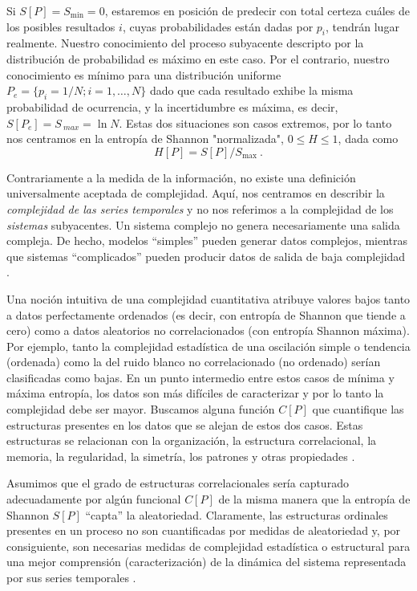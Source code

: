 Si $S[P] = S_{\min} = 0$, estaremos en posición de predecir con total certeza cuáles de los posibles resultados $i$, cuyas probabilidades están dadas por $p_i$, tendrán lugar realmente.
Nuestro conocimiento del proceso subyacente descripto por la distribución de probabilidad es máximo en este caso.
Por el contrario, nuestro conocimiento es mínimo para una distribución uniforme $P_e = \{p_i = 1/N; i = 1, \ldots, N \}$ dado que cada resultado exhibe la misma probabilidad de ocurrencia, y la incertidumbre es máxima, es decir, $S[P_e] = S_{\ max} = \ln N$.
Estas dos situaciones son casos extremos, por lo tanto nos centramos en la entropía de Shannon "normalizada", $0 \leq H \leq 1$, dada como
\begin{equation}
\label{shannon-disc-normalizada}
H[P] = S[P] / S_{\max} \ .
\end{equation}

Contrariamente a la medida de la información, no existe una definición universalmente aceptada de complejidad.
Aquí, nos centramos en describir la \textit{complejidad de las series temporales} y no nos referimos a la complejidad de los \textit{sistemas} subyacentes.
Un sistema complejo no genera necesariamente una salida compleja.
De hecho, modelos ``simples'' pueden generar datos complejos, mientras que sistemas ``complicados'' pueden producir datos de salida de baja complejidad \cite{Kantz1998}.

Una noción intuitiva de una complejidad cuantitativa atribuye valores bajos tanto a datos perfectamente ordenados (es decir, con entropía de Shannon que tiende a cero) como a datos aleatorios no correlacionados (con entropía Shannon máxima).
Por ejemplo, tanto la complejidad estadística de una oscilación simple o tendencia (ordenada) como la del ruido blanco no correlacionado (no ordenado) serían clasificadas como bajas.
En un punto intermedio entre estos casos de mínima y máxima entropía, los datos son más difíciles de caracterizar y por lo tanto la complejidad debe ser mayor.
Buscamos alguna función $C[P]$ que cuantifique las estructuras presentes en los datos que se alejan de estos dos casos.
Estas estructuras se relacionan con la organización, la estructura correlacional, la memoria, la regularidad, la simetría, los patrones y otras propiedades \cite{Feldman2008}.

Asumimos que el grado de estructuras correlacionales sería capturado adecuadamente por algún funcional $C[P]$ de la misma manera que la entropía de Shannon $S[P]$ \cite{Shannon1948} ``capta'' la aleatoriedad.
Claramente, las estructuras ordinales presentes en un proceso no son cuantificadas por medidas de aleatoriedad y, por consiguiente, son necesarias medidas de complejidad estadística o estructural para una mejor comprensión (caracterización) de la dinámica del sistema representada por sus series temporales \cite{Feldman1998}.

